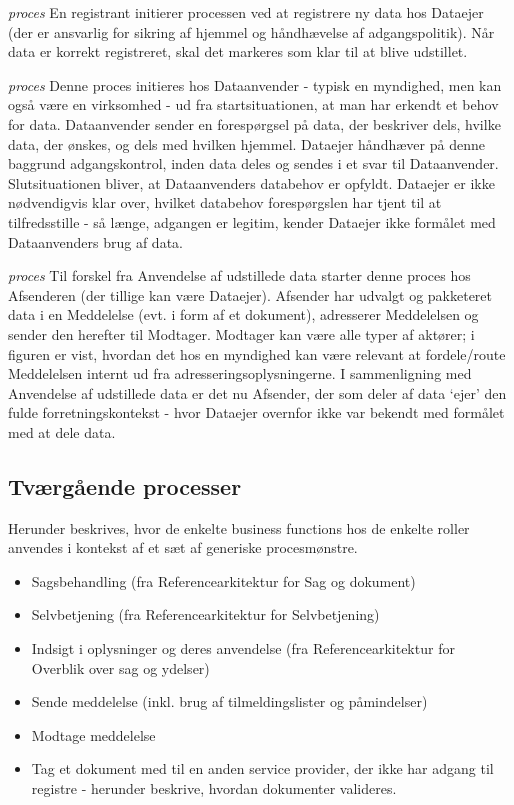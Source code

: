\begin{description}
\tightlist
\item[Registrering]
\emph{proces} En registrant initierer processen ved at registrere ny
data hos Dataejer (der er ansvarlig for sikring af hjemmel og
håndhævelse af adgangspolitik). Når data er korrekt registreret, skal
det markeres som klar til at blive udstillet.
\item[Anvendelse af udstillede data]
\emph{proces} Denne proces initieres hos Dataanvender - typisk en
myndighed, men kan også være en virksomhed - ud fra startsituationen, at
man har erkendt et behov for data. Dataanvender sender en forespørgsel
på data, der beskriver dels, hvilke data, der ønskes, og dels med
hvilken hjemmel. Dataejer håndhæver på denne baggrund adgangskontrol,
inden data deles og sendes i et svar til Dataanvender. Slutsituationen
bliver, at Dataanvenders databehov er opfyldt. Dataejer er ikke
nødvendigvis klar over, hvilket databehov forespørgslen har tjent til at
tilfredsstille - så længe, adgangen er legitim, kender Dataejer ikke
formålet med Dataanvenders brug af data.
\item[Forsendelse af meddelelser]
\emph{proces} Til forskel fra Anvendelse af udstillede data starter
denne proces hos Afsenderen (der tillige kan være Dataejer). Afsender
har udvalgt og pakketeret data i en Meddelelse (evt. i form af et
dokument), adresserer Meddelelsen og sender den herefter til Modtager.
Modtager kan være alle typer af aktører; i figuren er vist, hvordan det
hos en myndighed kan være relevant at fordele/route Meddelelsen internt
ud fra adresseringsoplysningerne. I sammenligning med Anvendelse af
udstillede data er det nu Afsender, der som deler af data `ejer' den
fulde forretningskontekst - hvor Dataejer overnfor ikke var bekendt med
formålet med at dele data.
\end{description}

\subsection{Tværgående processer}\label{tvuxe6rguxe5ende-processer}

Herunder beskrives, hvor de enkelte business functions hos de enkelte
roller anvendes i kontekst af et sæt af generiske procesmønstre.

\begin{itemize}
\tightlist
\item
  Sagsbehandling (fra Referencearkitektur for Sag og dokument)
\item
  Selvbetjening (fra Referencearkitektur for Selvbetjening)
\item
  Indsigt i oplysninger og deres anvendelse (fra Referencearkitektur for
  Overblik over sag og ydelser)
\item
  Sende meddelelse (inkl. brug af tilmeldingslister og påmindelser)
\item
  Modtage meddelelse
\item
  Tag et dokument med til en anden service provider, der ikke har adgang
  til registre - herunder beskrive, hvordan dokumenter valideres.
\end{itemize}

